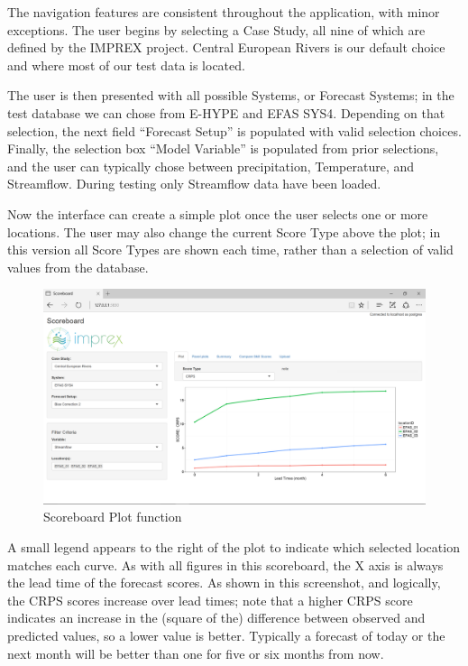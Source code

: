 \documentclass[logos,parttoc,morelanguage=french,morelanguage=german]{orsay-memoire}
\begin{document}
The navigation features are consistent throughout the application, with minor exceptions. The user begins by selecting a Case Study, all nine of which are defined by the IMPREX project. Central European Rivers is our default choice and where most of our test data is located.

The user is then presented with all possible Systems, or Forecast Systems; in the test database we can chose from E-HYPE and EFAS SYS4. Depending on that selection, the next field ``Forecast Setup'' is populated with valid selection choices. Finally, the selection box ``Model Variable'' is populated from prior selections, and the user can typically chose between precipitation, Temperature, and Streamflow. During testing only Streamflow data have been loaded.

Now the interface can create a simple plot once the user selects one or more locations. The user may also change the current Score Type above the plot; in this version all Score Types are shown each time, rather than a selection of valid values from the database.

\begin{figure}[H]
\centering
\includegraphics[width=0.9\linewidth]{images/isb1.png}
  \caption{Scoreboard Plot function}
  \label{fig:isb1}
\end{figure}

A small legend appears to the right of the plot to indicate which selected location matches each curve. As with all figures in this scoreboard, the X axis is always the lead time of the forecast scores. As shown in this screenshot, and logically, the CRPS scores increase over lead times; note that a higher CRPS score indicates an increase in the (square of the) difference between observed and predicted values, so a lower value is better. Typically a forecast of today or the next month will be better than one for five or six months from now.
\end{document}
